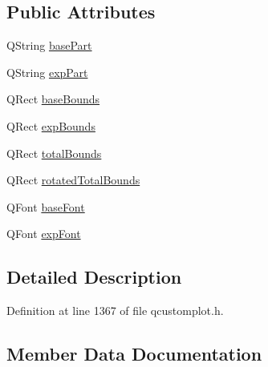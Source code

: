 \subsection*{Public Attributes}
\begin{DoxyCompactItemize}
\item 
Q\+String \hyperlink{struct_q_c_p_axis_painter_private_1_1_tick_label_data_ad65b76a5cafc412179a20b5d79809fc4}{base\+Part}
\item 
Q\+String \hyperlink{struct_q_c_p_axis_painter_private_1_1_tick_label_data_a09692e4ea092137278b4ac051d5fdf2b}{exp\+Part}
\item 
Q\+Rect \hyperlink{struct_q_c_p_axis_painter_private_1_1_tick_label_data_aac1047ae6ab8e9f5a42923082aabfff5}{base\+Bounds}
\item 
Q\+Rect \hyperlink{struct_q_c_p_axis_painter_private_1_1_tick_label_data_a6722d2bcefb93011e9dc42301b966846}{exp\+Bounds}
\item 
Q\+Rect \hyperlink{struct_q_c_p_axis_painter_private_1_1_tick_label_data_afbb3163cf4c628914f1b703945419ea5}{total\+Bounds}
\item 
Q\+Rect \hyperlink{struct_q_c_p_axis_painter_private_1_1_tick_label_data_aa4d38c5ea47c9184a78ee33ae7f1012e}{rotated\+Total\+Bounds}
\item 
Q\+Font \hyperlink{struct_q_c_p_axis_painter_private_1_1_tick_label_data_a0d4958a706debaa8d19a9b65fc090d56}{base\+Font}
\item 
Q\+Font \hyperlink{struct_q_c_p_axis_painter_private_1_1_tick_label_data_adc10767ebcb719d6927c012a38b9d933}{exp\+Font}
\end{DoxyCompactItemize}


\subsection{Detailed Description}


Definition at line 1367 of file qcustomplot.\+h.



\subsection{Member Data Documentation}
\hypertarget{struct_q_c_p_axis_painter_private_1_1_tick_label_data_aac1047ae6ab8e9f5a42923082aabfff5}{}
